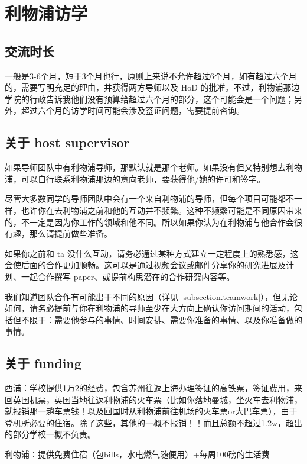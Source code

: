 \section{利物浦访学}
\label{section.UoL_visit}

\subsection{交流时长}
一般是3-6个月，短于3个月也行，原则上来说不允许超过6个月，如有超过六个月的，需要写明充足的理由，并获得两方导师以及 HoD 的批准。不过，利物浦那边学院的行政告诉我他们没有预算给超过六个月的部分，这个可能会是一个问题；另外，超过六个月的访学时间可能会涉及签证问题，需要提前咨询。

\subsection{关于 host supervisor}
如果导师团队中有利物浦导师，那默认就是那个老师。如果没有但又特别想去利物浦，可以自行联系利物浦那边的意向老师，要获得他/她的许可和签字。

尽管大多数同学的导师团队中会有一个来自利物浦的导师，但每个项目可能都不一样，也许你在去利物浦之前和他的互动并不频繁。这种不频繁可能是不同原因带来的，不一定是因为你工作的领域和他不同。所以如果你认为在利物浦与他合作会很有趣，那么请提前做些准备。

如果你之前和 ta 没什么互动，请务必通过某种方式建立一定程度上的熟悉感，这会使后面的合作更加顺畅。这可以是通过视频会议或邮件分享你的研究进展及计划、一起合作撰写 paper、或提前构思潜在的合作研究内容等。

我们知道团队合作有可能出于不同的原因（详见 \ref{subsection.teamwork}），但无论如何，请务必提前与你在利物浦的导师至少在大方向上确认你访问期间的活动，包括但不限于：需要他参与的事情、时间安排、需要你准备的事情、以及你准备做的事情。

\subsection{关于 funding}
西浦：学校提供1万2的经费，包含苏州往返上海办理签证的高铁票，签证费用，来回英国机票，英国当地往返利物浦的火车票（比如你落地曼城，坐火车去利物浦，就报销那一趟车票钱！以及回国时从利物浦前往机场的火车票or大巴车票），由于登机所必要的住宿。除了这些，其他的一概不报销！！而且总额不超过1.2w，超出的部分学校一概不负责。

利物浦：提供免费住宿（包bills，水电燃气随便用）+每周100磅的生活费


